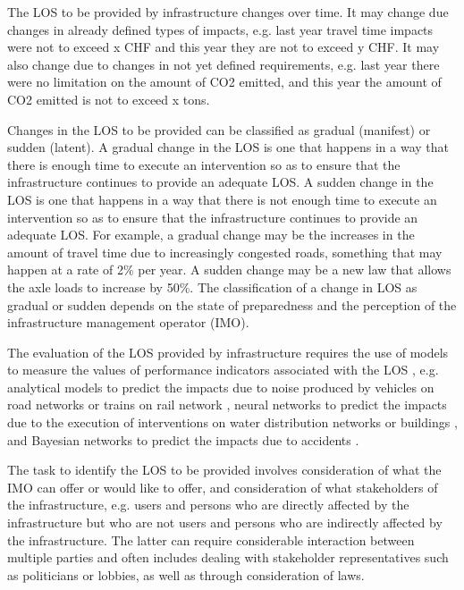 The LOS to be provided by infrastructure changes over time. It may change due changes in already defined types of impacts, e.g. last year travel time impacts were not to exceed x CHF and this year they are not to exceed y CHF. It may also change due to changes in not yet defined requirements, e.g. last year there were no limitation on the amount of CO2 emitted, and this year the amount of CO2 emitted is not to exceed x tons.

Changes in the LOS to be provided can be classified as gradual (manifest) or sudden (latent). A gradual change in the LOS is one that happens in a way that there is enough time to execute an intervention so as to ensure that the infrastructure continues to provide an adequate LOS. A sudden change in the LOS is one that happens in a way that there is not enough time to execute an intervention so as to ensure that the infrastructure continues to provide an adequate LOS. For example, a gradual change may be the increases in the amount of travel time due to increasingly congested roads, something that may happen at a rate of 2\% per year. A sudden change may be a new law that allows the axle loads to increase by 50\%. The classification of a change in LOS as gradual or sudden depends on the state of preparedness and the perception of the infrastructure management operator (IMO). 


The evaluation of the LOS provided by infrastructure requires the use of models to measure the values of performance indicators associated with the LOS \citep{Talvitie1999}, e.g. analytical models to predict the impacts due to noise produced by vehicles on road networks \citep{Fyhri2010} or trains on rail network \citep{herrmann08}, neural networks to predict the impacts due to the execution of interventions on water distribution networks \citep{Bowden2006} or buildings \citep{Marzouk2013}, and Bayesian networks to predict the impacts due to accidents \citep{Wang2013}.

The task to identify the LOS to be provided involves consideration of what the IMO can offer or would like to offer, and consideration of what stakeholders of the infrastructure, e.g. users and persons who are directly affected by the infrastructure but who are not users and persons who are indirectly affected by the infrastructure. The latter can require considerable interaction between multiple parties and often includes dealing with stakeholder representatives such as politicians or lobbies, as well as through consideration of laws.

